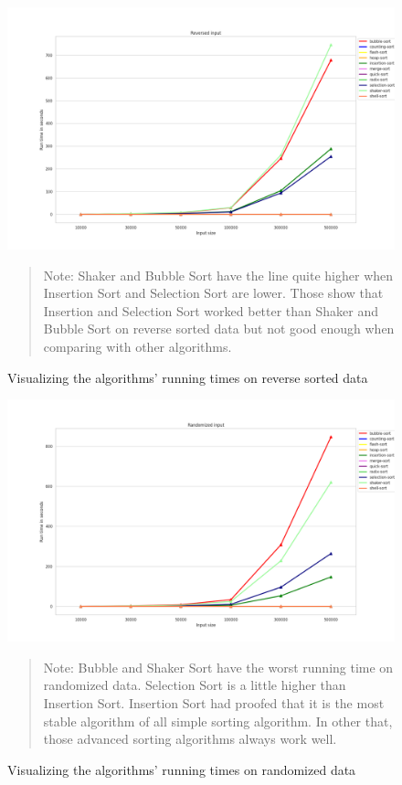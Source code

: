 \documentclass[11pt,a4paper]{article}
\newenvironment{fignote}{\begin{quote}\footnotesize}{\end{quote}}
\begin{document}
\begin{figure}[H]
  \includegraphics[width = 16cm]{plot/rev_line.png}
  \centering
  \begin{fignote} 
    Note: Shaker and Bubble Sort have the line quite higher when Insertion Sort and Selection Sort are lower. 
    Those show that Insertion and Selection Sort worked better than Shaker and Bubble Sort on reverse sorted data but not good enough 
    when comparing with other algorithms.
  \end{fignote}
  \caption{Visualizing the algorithms' running times on reverse sorted data}
\end{figure}

\begin{figure}[H]
  \includegraphics[width = 16cm]{plot/rand_line.png}
  \centering
  \begin{fignote} 
    Note: Bubble and Shaker Sort have the worst running time on randomized data.
    Selection Sort is a little higher than Insertion Sort. 
    Insertion Sort had proofed that it is the most stable algorithm of all simple sorting algorithm. 
    In other that, those advanced sorting algorithms always work well.
  \end{fignote}
  \caption{Visualizing the algorithms' running times on randomized data}
\end{figure}
\end{document}
